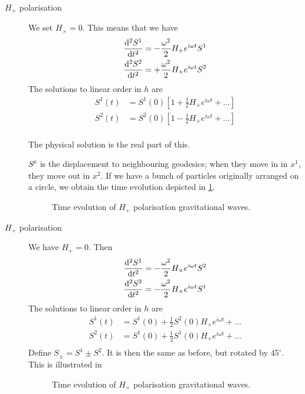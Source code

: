 \begin{description}
  \item[$H_+$ polarisation] We set $H_\times = 0$. This means that we have
    \begin{align}
      \dv[2]{S^1}{t} &= - \frac{\omega^2}{2} H_+ e^{i \omega t} S^1 \\
      \dv[2]{S^2}{t} &= + \frac{\omega^2}{2} H_+ e^{i \omega t} S^2
    \end{align}
    The solutions to linear order in $h$ are
    \begin{align}
      S^1 (t) &= S^1 (0) \left[1 + \frac{1}{2} H_+ e^{i \omega t} + \dots\right] \\
      S^2 (t) &= S^2 (0) \left[1 - \frac{1}{2} H_+ e^{i \omega t} + \dots\right] \\
    \end{align}
    \begin{remark}
      The physical solution is the real part of this.
    \end{remark}
    $S^{\mu}$ is the displacement to neighbouring geodesics; when they move in in $x^1$, they move out in  $x^2$.
    If we have a bunch of particles originally arranged on a circle, we obtain the time evolution depicted in %
    \ref{fig:l21f1}.
     \begin{figure}[tbhp]
      \centering
      \def\svgwidth{0.4\columnwidth}
      
      \caption{Time evolution of $H_+$ polarisation gravitational waves.}
      \label{fig:l21f1}
    \end{figure}

  \item[$H_\times$ polarisation] We have $H_+ = 0$. Then
    \begin{align}
      \dv[2]{S^1}{t} &= - \frac{\omega^2}{2} H_\times e^{i \omega t} S^2 \\
      \dv[2]{S^2}{t} &= - \frac{\omega^2}{2} H_\times e^{i \omega t} S^1
    \end{align}
    The solutions to linear order in $h$ are
    \begin{align}
    S^1 (t) &= S^1 (0) + \frac{1}{2} S^2(0) H_\times e^{i \omega t} + \dots \\
    S^2 (t) &= S^1(0) + \frac{1}{2} S^1(0) H_+ e^{i \omega t} + \dots \\
    \end{align}
    Define $S_\pm = S^1 \pm S^2$. It is then the same as before, but rotated by  $45^\circ$. This is illustrated in %
     \begin{figure}[tbhp]
      \centering
      \def\svgwidth{0.4\columnwidth}
      
      \caption{Time evolution of $H_\times$ polarisation gravitational waves.}
      \label{fig:l21f2}
    \end{figure}
\end{description}

